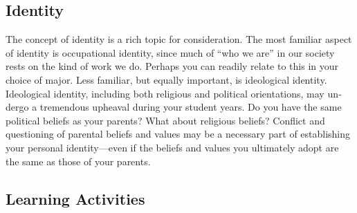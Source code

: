 \documentclass[
]{book}
\begin{document}
\hypertarget{identity}{%
\subsection*{Identity}\label{identity}}

The concept of identity is a rich topic for consideration. The most familiar aspect of identity is occupational identity, since much of ``who we are'' in our society rests on the kind of work we do. Perhaps you can readily relate to this in your choice of major. Less familiar, but equally important, is ideological identity. Ideologi­cal identity, including both religious and political orientations, may un­dergo a tremen­dous upheaval during your student years. Do you have the same political beliefs as your parents? What about religious beliefs? Conflict and questioning of parental beliefs and values may be a necessary part of establishing your personal iden­tity---even if the beliefs and values you ultimately adopt are the same as those of your parents.

\hypertarget{learning-activities}{%
\subsection*{Learning Activities}\label{learning-activities}}
\end{document}

